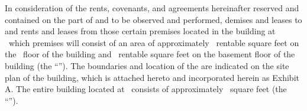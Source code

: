In consideration of the rents, covenants, and agreements hereinafter reserved and contained on the part of \lessee and \lessor to be observed and performed, \lessor demises and leases to \lessee and \lessee rents and leases from \lessor those certain premises located in the building at \buildingAddress\ which premises will consist of an area of approximately \premisesRSF\ rentable square feet on the \premisesFloorText\ floor of the building and \premisesBasementSF\ rentable square feet on the basement floor of the building (the ``\premises''). The boundaries and location of the \premises are indicated on the site plan of the building, which is attached hereto and incorporated herein as Exhibit A. The entire building located at \buildingAddress\ consists of approximately \buildingRSF\ square feet (the ``\building'').
